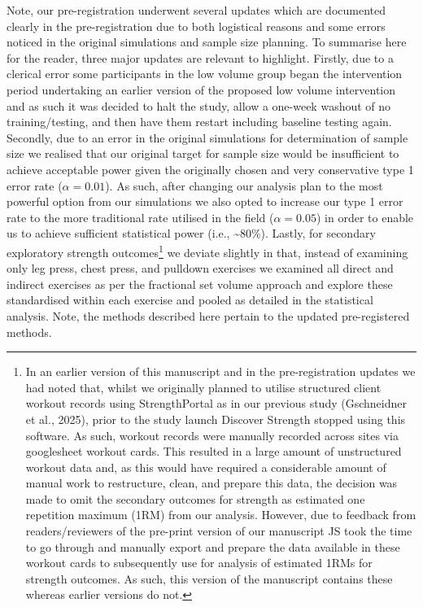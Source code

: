 \documentclass[
]{article}
\begin{document}
Note, our pre-registration underwent several updates which are
documented clearly in the pre-registration due to both logistical
reasons and some errors noticed in the original simulations and sample
size planning. To summarise here for the reader, three major updates are
relevant to highlight. Firstly, due to a clerical error some
participants in the low volume group began the intervention period
undertaking an earlier version of the proposed low volume intervention
and as such it was decided to halt the study, allow a one-week washout
of no training/testing, and then have them restart including baseline
testing again. Secondly, due to an error in the original simulations for
determination of sample size we realised that our original target for
sample size would be insufficient to achieve acceptable power given the
originally chosen and very conservative type 1 error rate
(\(\alpha=0.01\)). As such, after changing our analysis plan to the most
powerful option from our simulations we also opted to increase our type
1 error rate to the more traditional rate utilised in the field
(\(\alpha=0.05\)) in order to enable us to achieve sufficient
statistical power (i.e., \textasciitilde80\%). Lastly, for secondary
exploratory strength outcomes\footnote{In an earlier version of this
  manuscript and in the pre-registration updates we had noted that,
  whilst we originally planned to utilise structured client workout
  records using StrengthPortal as in our previous study (Gschneidner et
  al., 2025), prior to the study launch Discover Strength stopped using
  this software. As such, workout records were manually recorded across
  sites via googlesheet workout cards. This resulted in a large amount
  of unstructured workout data and, as this would have required a
  considerable amount of manual work to restructure, clean, and prepare
  this data, the decision was made to omit the secondary outcomes for
  strength as estimated one repetition maximum (1RM) from our analysis.
  However, due to feedback from readers/reviewers of the pre-print
  version of our manuscript JS took the time to go through and manually
  export and prepare the data available in these workout cards to
  subsequently use for analysis of estimated 1RMs for strength outcomes.
  As such, this version of the manuscript contains these whereas earlier
  versions do not.} we deviate slightly in that, instead of examining
only leg press, chest press, and pulldown exercises we examined all
direct and indirect exercises as per the fractional set volume approach
and explore these standardised within each exercise and pooled as
detailed in the statistical analysis. Note, the methods described here
pertain to the updated pre-registered methods.
\end{document}
